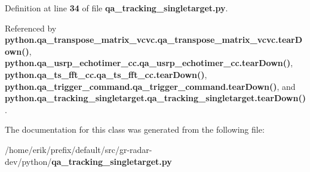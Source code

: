 Definition at line {\bf 34} of file {\bf qa\+\_\+tracking\+\_\+singletarget.\+py}.



Referenced by {\bf python.\+qa\+\_\+transpose\+\_\+matrix\+\_\+vcvc.\+qa\+\_\+transpose\+\_\+matrix\+\_\+vcvc.\+tear\+Down()}, {\bf python.\+qa\+\_\+usrp\+\_\+echotimer\+\_\+cc.\+qa\+\_\+usrp\+\_\+echotimer\+\_\+cc.\+tear\+Down()}, {\bf python.\+qa\+\_\+ts\+\_\+fft\+\_\+cc.\+qa\+\_\+ts\+\_\+fft\+\_\+cc.\+tear\+Down()}, {\bf python.\+qa\+\_\+trigger\+\_\+command.\+qa\+\_\+trigger\+\_\+command.\+tear\+Down()}, and {\bf python.\+qa\+\_\+tracking\+\_\+singletarget.\+qa\+\_\+tracking\+\_\+singletarget.\+tear\+Down()}.



The documentation for this class was generated from the following file\+:\begin{DoxyCompactItemize}
\item 
/home/erik/prefix/default/src/gr-\/radar-\/dev/python/{\bf qa\+\_\+tracking\+\_\+singletarget.\+py}\end{DoxyCompactItemize}
